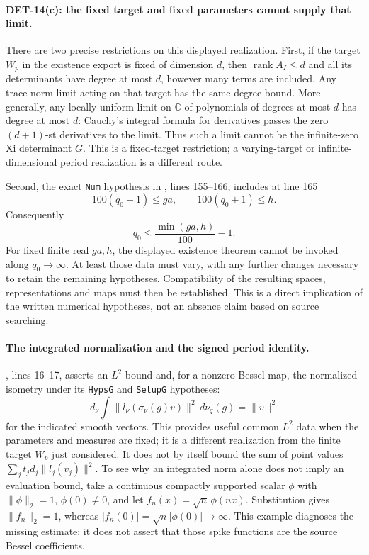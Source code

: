 \documentclass[11pt,a4paper]{article}
\begin{document}
\paragraph{DET-14(c): the fixed target and fixed parameters cannot supply that limit.}
There are two precise restrictions on this displayed realization.
First, if the target \(W_p\) in the existence export is fixed of
dimension \(d\), then \(\operatorname{rank}A_I\le d\) and all its
determinants have degree at most \(d\), however many terms are
included. Any trace-norm limit acting on that target has the
same degree bound. More generally, any locally uniform limit on
\(\mathbb C\) of polynomials of degrees at most \(d\) has degree
at most \(d\): Cauchy's integral formula for derivatives passes
the zero \((d+1)\)-st derivatives to the limit. Thus such a limit
cannot be the infinite-zero Xi determinant \(G\).
This is a fixed-target restriction; a varying-target or
infinite-dimensional period realization is a different route.

Second, the exact \texttt{Num} hypothesis in
,
lines 155--166, includes at line 165
\[
 100(q_0+1)\le ga,\qquad 100(q_0+1)\le h.
\]
Consequently
\[
 q_0\le\frac{\min(ga,h)}{100}-1.
\]
For fixed finite real \(ga,h\), the displayed existence theorem
cannot be invoked along \(q_0\to\infty\).
At least those data must vary, with any further changes necessary
to retain the remaining hypotheses. Compatibility of the resulting
spaces, representations and maps must then be established.
This is a direct implication of the written numerical hypotheses,
not an absence claim based on source searching.

\paragraph{The integrated normalization and the signed period identity.}
,
lines 16--17, asserts an \(L^2\) bound and, for a nonzero Bessel map,
the normalized isometry under its \texttt{HypsG} and
\texttt{SetupG} hypotheses:
\[
 d_\nu\int
 \|l_\nu(\sigma_\nu(g)v)\|^2\,d\nu_q(g)=\|v\|^2
\]
for the indicated smooth vectors. This provides useful common
\(L^2\) data when the parameters and measures are fixed; it is
a different realization from the finite target \(W_p\) just considered.
It does not by itself bound the sum of point values
\(\sum_jt_jd_j\|l_j(v_j)\|^2\).
To see why an integrated norm alone does not imply an evaluation
bound, take a continuous compactly supported scalar \(\phi\) with
\(\|\phi\|_2=1\), \(\phi(0)\ne0\), and let
\(f_n(x)=\sqrt n\,\phi(nx)\).
Substitution gives \(\|f_n\|_2=1\), whereas
\(|f_n(0)|=\sqrt n|\phi(0)|\to\infty\).
This example diagnoses the missing estimate; it does not assert
that those spike functions are the source Bessel coefficients.
\end{document}
